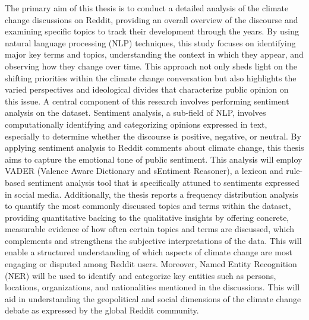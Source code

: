 The primary aim of this thesis is to conduct a detailed analysis of the climate change discussions on 
Reddit, providing an overall overview of the discourse and examining specific topics to track their 
development through the years. By using natural language processing (NLP) techniques, this study 
focuses on identifying major key terms and topics, understanding the context in which they appear, and observing 
how they change over time. This approach not only sheds light on the shifting priorities within the 
climate change conversation but also highlights the varied perspectives and ideological divides that 
characterize public opinion on this issue.
A central component of this research involves performing sentiment analysis on the dataset. Sentiment 
analysis, a sub-field of NLP, involves computationally identifying and categorizing opinions expressed 
in text, especially to determine whether the discourse is positive, negative, or neutral. By applying 
sentiment analysis to Reddit comments about climate change, this thesis aims to capture the 
emotional tone of public sentiment. This analysis will employ VADER (Valence Aware 
Dictionary and sEntiment Reasoner), a lexicon and rule-based sentiment analysis tool that is 
specifically attuned to sentiments expressed in social media.
Additionally, the thesis reports a frequency distribution analysis to quantify the most commonly discussed 
topics and terms within the dataset, providing quantitative backing to the qualitative insights by offering 
concrete, measurable evidence of how often certain topics and terms are discussed, which complements and 
strengthens the subjective interpretations of the data. This will enable a structured understanding of which 
aspects of climate change are most engaging or disputed among Reddit users. Moreover, Named Entity Recognition 
(NER) will be used to identify and categorize key entities such as persons, locations, organizations, and 
nationalities mentioned in the discussions. This will aid in understanding the geopolitical and social dimensions 
of the climate change debate as expressed by the global Reddit community.

